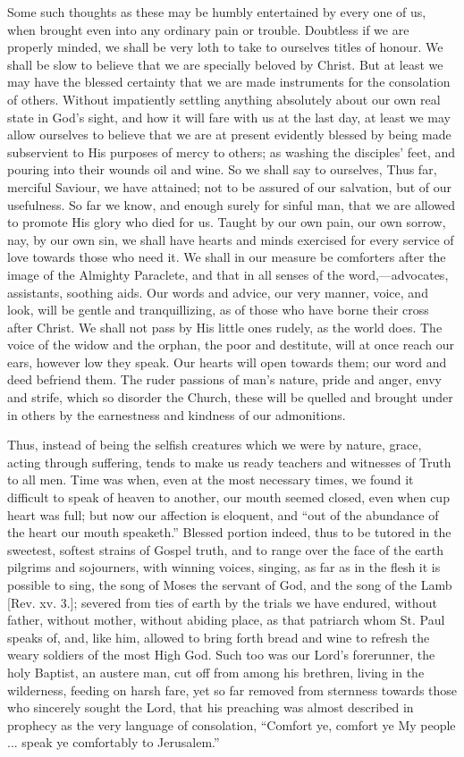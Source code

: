 Some such thoughts as these may be humbly entertained by every one
of us, when brought even into any ordinary pain or trouble. Doubtless
if we are properly minded, we shall be very loth to take to ourselves
titles of honour. We shall be slow to believe that we are specially
beloved by Christ. But at least we may have the blessed certainty that
we are made instruments for the consolation of others. Without
impatiently settling anything absolutely about our own real state in
God's sight, and how it will fare with us at the last day, at least we
may allow ourselves to believe that we are at present evidently
blessed by being made subservient to His purposes of mercy to others;
as washing the disciples' feet, and pouring into their wounds oil and
wine. So we shall say to ourselves, Thus far, merciful Saviour, we
have attained; not to be assured of our salvation, but of our
usefulness. So far we know, and enough surely for sinful man, that we
are allowed to promote His glory who died for us. Taught by our own
pain, our own sorrow, nay, by our own sin, we shall have hearts and
minds exercised for every service of love towards those who need it.
We shall in our measure be comforters after the image of the Almighty
Paraclete, and that in all senses of the word,—advocates,
assistants, soothing aids. Our words and advice, our very manner,
voice, and look, will be gentle and tranquillizing, as of those who
have borne their cross after Christ. We shall not pass by His little
ones rudely, as the world does. The voice of the widow and the orphan,
the poor and destitute, will at once reach our ears, however low they
speak. Our hearts will open towards them; our word and deed befriend
them. The ruder passions of man's nature, pride and anger, envy and
strife, which so disorder the Church, these will be quelled and
brought under in others by the earnestness and kindness of our
admonitions.

Thus, instead of being the selfish creatures which we were by
nature, grace, acting through suffering, tends to make us ready
teachers and witnesses of Truth to all men. Time was when, even at the
most necessary times, we found it difficult to speak of heaven to
another, our mouth seemed closed, even when cup heart was full; but
now our affection is eloquent, and ``out of the abundance of the
heart our mouth speaketh.'' Blessed portion indeed, thus to be
tutored in the sweetest, softest strains of Gospel truth, and to range
over the face of the earth pilgrims and sojourners, with winning
voices, singing, as far as in the flesh it is possible to sing, the
song of Moses the servant of God, and the song of the Lamb [Rev. xv.
3.]; severed from ties of earth by the trials we have endured, without
father, without mother, without abiding place, as that patriarch whom
St. Paul speaks of, and, like him, allowed to bring forth bread and
wine to refresh the weary soldiers of the most High God. Such too was
our Lord's forerunner, the holy Baptist, an austere man, cut off from
among his brethren, living in the wilderness, feeding on harsh fare,
yet so far removed from sternness towards those who sincerely sought
the Lord, that his preaching was almost described in prophecy as the
very language of consolation, ``Comfort ye, comfort ye My people
... speak ye comfortably to Jerusalem.''

